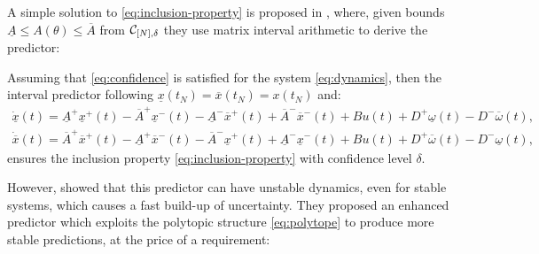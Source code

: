 \documentclass{article}
\begin{document}
A simple solution to \eqref{eq:inclusion-property} is proposed in \citep{Efimov2012}, where, given bounds $\underline{A}\leq A(\theta)\leq\overline{A}$ from $\mathcal{C}_{[N],\delta}$ they use matrix interval arithmetic to derive the predictor:
\begin{proposition}
Assuming that \eqref{eq:confidence} is satisfied for the system \eqref{eq:dynamics}, then the interval predictor following $\underline{x}(t_N)=\overline{x}(t_N)={x}(t_N)$ and:
\begin{eqnarray}
\dot{\underline{x}}(t) = \underline{A}^{+}\underline{x}^{+}(t)-\overline{A}^{+}\underline{x}^{-}(t)-\underline{A}^{-}\overline{x}^{+}(t) +\overline{A}^{-}\overline{x}^{-}(t) +Bu(t) + D^{+}\underline{\omega}(t)-D^{-}\overline{\omega}(t),\label{eq:predictor-naive}\\
\dot{\overline{x}}(t) = \overline{A}^{+}\overline{x}^{+}(t)-\underline{A}^{+}\overline{x}^{-}(t)-\overline{A}^{-}\underline{x}^{+}(t)+\underline{A}^{-}\underline{x}^{-}(t)\nonumber+Bu(t) + D^{+}\overline{\omega}(t)-D^{-}\underline{\omega}(t),\nonumber
\end{eqnarray}
ensures the inclusion property \eqref{eq:inclusion-property} with confidence level $\delta$.
\end{proposition}

However, \citet{leurent2019interval} showed that this predictor can have unstable dynamics, even for stable systems, which causes a fast build-up of uncertainty. They proposed an enhanced predictor which exploits the polytopic structure \eqref{eq:polytope} to produce more stable predictions, at the price of a requirement:
\end{document}

